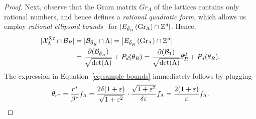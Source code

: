 \begin{proof}
  Next, observe that the Gram matrix $Gr_\Lambda$ of the lattices \Lattices contains only rational numbers, and hence defines a \emph{rational quadratic form}, which allows us employ \emph{rational ellipsoid bounds}~\cite{ivic2004lattice} for $|E_{\Bar{\theta}_R}\left(\text{Gr}_\Lambda\right)\cap \mathbb{Z}^d|$. Hence,
\begin{align}
    |\mathcal{X}_{\Lambda}^{\delta,\varepsilon}\cap \mathcal{B}_R
|&=|\mathcal{B}_{\Bar{\theta}_R}\cap \Lambda|=\left|E_{\Bar{\theta}_R}\left(\text{Gr}_\Lambda\right)\cap \mathbb{Z}^d\right|\nonumber\\
&=\frac{\partial(\mathcal{B}_{\Bar{\theta}_R})}{\sqrt{\det(\Lambda)}}+P_d(\Bar{\theta}_R)=\frac{\partial(\mathcal{B}_1)}{\sqrt{\det(\Lambda)}}\Bar{\theta}_R^d+P_d(\Bar{\theta}_R). \label{eq:sample_complexity}
\end{align}
The expression in Equation~\eqref{eq:sample bounds} immediately follows by plugging
\[\Bar{\theta}_{r^*}=\frac{r^*}{{\beta^*}}f_\Lambda = \frac{2\delta(1+\varepsilon)}{\sqrt{1+\varepsilon^2}}\cdot \frac{\sqrt{1+\varepsilon^2}}{\delta\varepsilon} f_\Lambda = \frac{2(1+\varepsilon)}{\varepsilon}f_\Lambda.\]
\end{proof}

